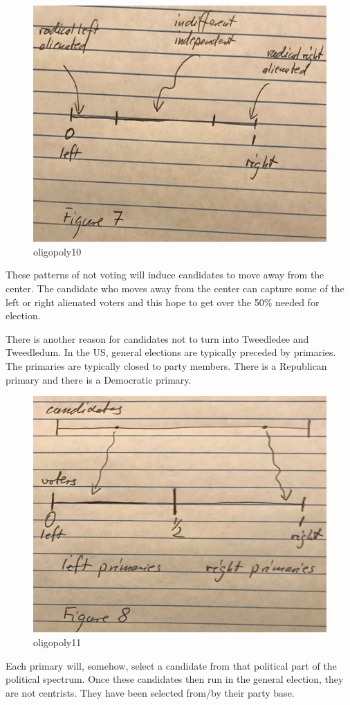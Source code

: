 \documentclass[
]{book}
\begin{document}
\begin{figure}

{\centering \includegraphics[width=0.5\linewidth]{img/oligopoly/fig10} 

}

\caption{oligopoly10}\label{fig:oligopoly10}
\end{figure}

These patterns of not voting will induce candidates to move away from the center. The candidate who moves away from the center can capture some of the left or right alienated voters and this hope to get over the 50\% needed for election.

There is another reason for candidates not to turn into Tweedledee and Tweedledum. In the US, general elections are typically preceded by primaries. The primaries are typically closed to party members. There is a Republican primary and there is a Democratic primary.

\begin{figure}

{\centering \includegraphics[width=0.5\linewidth]{img/oligopoly/fig11} 

}

\caption{oligopoly11}\label{fig:oligopoly11}
\end{figure}

Each primary will, somehow, select a candidate from that political part of the political spectrum. Once these candidates then run in the general election, they are not centrists. They have been selected from/by their party base.
\end{document}
